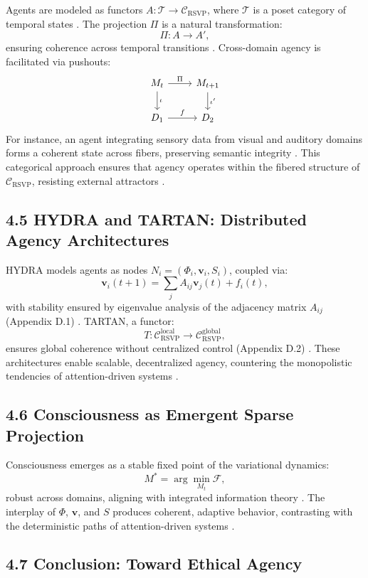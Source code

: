\documentclass[12pt]{article}
\begin{document}
Agents are modeled as functors \(A: \mathcal{T} \to \mathcal{C}_{\text{RSVP}}\), where \(\mathcal{T}\) is a poset category of temporal states \citep{lawvere2009}. The projection \(\Pi\) is a natural transformation:
\[
\Pi: A \to A',
\]
ensuring coherence across temporal transitions \citep{maclane1998}. Cross-domain agency is facilitated via pushouts:
\[
\begin{tikzcd}
M_t \arrow[r, "\Pi"] \arrow[d, "\iota"] & M_{t+1} \arrow[d, "\iota'"] \\
D_1 \arrow[r, "f"] & D_2
\end{tikzcd}
\]
For instance, an agent integrating sensory data from visual and auditory domains forms a coherent state across fibers, preserving semantic integrity \citep{may1999}. This categorical approach ensures that agency operates within the fibered structure of \(\mathcal{C}_{\text{RSVP}}\), resisting external attractors \citep{deleuze1987}.

\subsection*{4.5 HYDRA and TARTAN: Distributed Agency Architectures}

HYDRA models agents as nodes \(N_i = (\Phi_i, \mathbf{v}_i, S_i)\), coupled via:
\[
\mathbf{v}_i(t+1) = \sum_j A_{ij} \mathbf{v}_j(t) + f_i(t),
\]
with stability ensured by eigenvalue analysis of the adjacency matrix \(A_{ij}\) (Appendix D.1) \citep{bird1988}. TARTAN, a functor:
\[
T: \mathcal{C}_{\text{RSVP}}^{\text{local}} \to \mathcal{C}_{\text{RSVP}}^{\text{global}},
\]
ensures global coherence without centralized control (Appendix D.2) \citep{milewski2018}. These architectures enable scalable, decentralized agency, countering the monopolistic tendencies of attention-driven systems \citep{zuboff2019}.

\subsection*{4.6 Consciousness as Emergent Sparse Projection}

Consciousness emerges as a stable fixed point of the variational dynamics:
\[
M^* = \arg\min_{M_t} \mathcal{F},
\]
robust across domains, aligning with integrated information theory \citep{tononi2004}. The interplay of \(\Phi\), \(\mathbf{v}\), and \(S\) produces coherent, adaptive behavior, contrasting with the deterministic paths of attention-driven systems \citep{hohwy2013}.

\subsection*{4.7 Conclusion: Toward Ethical Agency}
\end{document}
